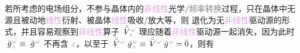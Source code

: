 若所考虑的电场组分，不参与晶体内的\textcolor{Plum}{非线性}\textcolor{NavyBlue}{光学}/\textcolor{gray}{频率转换}过程，只在晶体中\textcolor{NavyBlue}{无源}且\textcolor{NavyBlue}{被动}地\textcolor{Plum}{线性}衍射、被晶体\textcolor{Plum}{线性}\textcolor{NavyBlue}{吸收}/\textcolor{NavyBlue}{放大}等，则  退化为无\textcolor{Plum}{非线性}\textcolor{NavyBlue}{驱动源}的形式，并且容易观察到\textcolor{Plum}{非线性}算子 $\xint{\mathcolor{gray}{-}}{21}{\bar{\bar{V}}}^{\;\! \mathcolor{gray}{\omega}}_{\;\! \mathcolor{gray}{z}}$ 理应随着\textcolor{Plum}{非线性}\textcolor{NavyBlue}{驱动源}一起消失，因为此时 $\xint{{}^{}_{\mathcolor{gray}{-}}}{10}{\bar{g}}^{\;\!\mathcolor{gray}{\omega}}_{\;\! \mathcolor{gray}{z}} \equiv \xint{{}^{}_{\mathcolor{gray}{-}}}{10}{\bar{g}}^{\;\!\mathcolor{gray}{\omega}}$ 不再含 $\mathcolor{gray}{z}$，以至于 $\xint{\mathcolor{gray}{-}}{21}{\bar{\bar{V}}}^{\;\! \mathcolor{gray}{\omega}} \xint{{}^{}_{\mathcolor{gray}{-}}}{10}{\bar{g}}^{\;\!\mathcolor{gray}{\omega}}_{\;\! \mathcolor{gray}{z}} \equiv \xint{\mathcolor{gray}{-}}{21}{\bar{\bar{V}}}^{\;\! \mathcolor{gray}{\omega}} \xint{{}^{}_{\mathcolor{gray}{-}}}{10}{\bar{g}}^{\;\!\mathcolor{gray}{\omega}} = \bar{0}$，则有
